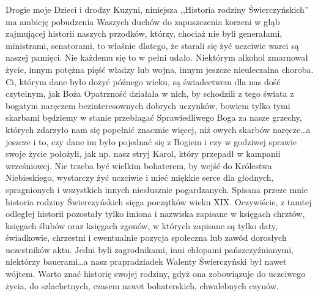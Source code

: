 Drogie moje Dzieci i drodzy Kuzyni, niniejsza ,,Historia rodziny Świerczyńskich'' ma ambicję pobudzenia Waszych duchów do zapuszczenia korzeni w głąb zajmującej historii naszych przodków, którzy, chociaż nie byli generałami, ministrami, senatorami, to właśnie dlatego, że starali się żyć uczciwie warci są naszej pamięci. Nie każdemu się to w pełni udało. Niektórym alkohol zmarnował życie, innym potężna pięść władzy lub wojna, innym jeszcze nieuleczalna choroba. Ci, którym dane było dożyć późnego wieku, są świadectwem dla nas dość czytelnym, jak Boża Opatrzność działała w nich,  by schodzili z tego świata z bogatym naręczem bezinteresownych dobrych uczynków, bowiem tylko tymi skarbami będziemy w stanie przebłagać Sprawiedliwego Boga za nasze grzechy, których zdarzyło nam się popełnić znacznie więcej, niż owych skarbów naręcze\ldots a jeszcze i to, czy dane im było pojednać się z Bogiem i czy w godziwej sprawie swoje życie położyli, jak np. nasz stryj Karol, który przepadł w kampanii wrześniowej. Nie trzeba być wielkim bohaterem, by wejść do Królestwa Niebieskiego, wystarczy żyć uczciwie i mieć miękkie serce dla głodnych, spragnionych i wszystkich innych niesłusznie pogardzanych. Spisana przeze mnie historia rodziny Świerczyńskich sięga początków wieku XIX. Oczywiście, z tamtej odległej historii pozostały tylko imiona i nazwiska zapisane w księgach chrztów, księgach ślubów oraz księgach zgonów, w których zapisane są tylko daty, świadkowie, chrzestni i ewentualnie pozycja społeczna lub zawód dorosłych uczestników aktu. Jedni byli zagrodnikami, inni chłopami pańszczyźnianymi, niektórzy bauerami\ldots a nasz prapradziadek Walenty Świerczyński był nawet wójtem. Warto znać historię swojej rodziny, gdyż ona zobowiązuje do uczciwego życia, do szlachetnych, czasem nawet bohaterskich, chwalebnych czynów.